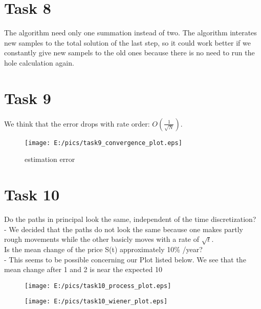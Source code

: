 \documentclass{article}
\begin{document}
\section*{Task 8}
The algorithm need only one summation instead of two. The algorithm interates new samples to the total solution of the last step, so it could work better if we constantly give new sampels to the old ones because there is no need to run the hole calculation again. 

\newpage
\section*{Task 9}
We think that the error drops with rate order: $O\left(\frac{1}{\sqrt{N}}\right)$.
\begin{figure}[htbp]
	\centering
		\texttt{[image: E:/pics/task9\_convergence\_plot.eps]}
	\caption{estimation error}
	\label{fig:task9_convergence_plot}
\end{figure}

\section*{Task 10}
Do the paths in principal look the same, independent of the time discretization?\\
- We decided that the paths do not look the same because one makes partly rough movements while the other basicly moves with a rate of $\sqrt{t}$.\\
Is the mean change of the price S(t) approximately 10\% /year?\\
- This seems to be possible concerning our Plot listed below. We see that the mean change after 1 and 2 is near the expected 10%
\begin{figure}[htbp]
	\centering
		\texttt{[image: E:/pics/task10\_process\_plot.eps]}
	\label{fig:task10_process_plot}
\end{figure}
\begin{figure}[htbp]
	\centering
		\texttt{[image: E:/pics/task10\_wiener\_plot.eps]}
	\label{fig:task10_wiener_plot}
\end{figure}
\end{document}
